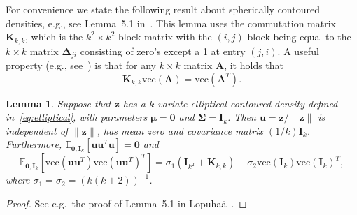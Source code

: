 \documentclass{article}
\numberwithin{equation}{section}
\theoremstyle{plain}
\newtheorem{lemma}{Lemma}
\newcommand{\vc}{\mathrm{vec}}
\newcommand{\bmu}{\bm\mu}
\newcommand{\bSigma}{\mathbf{\Sigma}}
\newcommand{\bu}{\mathbf{u}}
\newcommand{\bz}{\mathbf{z}}
\newcommand{\bI}{\mathbf{I}}
\newcommand{\bA}{\mathbf{A}}
\newcommand{\bK}{\mathbf{K}}
\begin{document}
For convenience we state the following result about spherically contoured densities,
e.g., see Lemma~5.1 in~\cite{lopuhaa1989}.
This lemma uses the commutation matrix $\mathbf{K}_{k,k}$, which
is the $k^2\times k^2$ block matrix with the $(i,j)$-block being equal to the $k\times k$ matrix $\mathbf{\Delta}_{ji}$
consisting of zero's except a 1 at entry $(j,i)$.
A useful property (e.g., see~\cite[Section 3.7]{magnus&neudecker1988}) is that for any $k\times k$ matrix $\bA$,
it holds that
\begin{equation}
\label{eq:prop K}
\bK_{k,k}\vc(\bA)=\vc(\bA^T).
\end{equation}
\begin{lemma}
\label{lem:Lemma 5.1}
Suppose that $\bz$ has a $k$-variate elliptical contoured density
defined in~\eqref{eq:elliptical}, with parameters $\bmu=\mathbf{0}$ and $\bSigma=\bI_k$.
Then $\bu=\bz/\|\bz\|$ is independent of $\|\bz\|$,
has mean zero and covariance matrix $(1/k)\bI_k$.
Furthermore, $\mathbb{E}_{\mathbf{0},\bI_k}[\bu\bu^T\bu]=\mathbf{0}$
and
\[
\mathbb{E}_{\mathbf{0},\bI_k}
\left[
\vc(\bu\bu^T)\vc(\bu\bu^T)^T
\right]
=
\sigma_1(\bI_{k^2}+\mathbf{K}_{k,k})+\sigma_2\vc(\bI_k)\vc(\bI_k)^T,
\]
where $\sigma_1=\sigma_2=(k(k+2))^{-1}$.
\end{lemma}
\begin{proof}
See e.g.~the proof of Lemma~5.1 in Lopuha\"a~\cite{lopuhaa1989}.
\end{proof}
\end{document}
